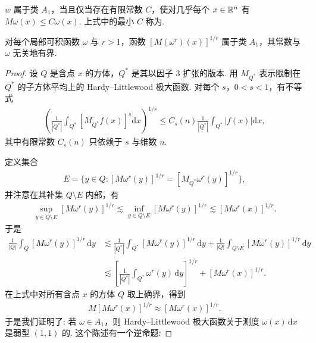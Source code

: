 \begin{definition}\label{def:4.11}
 $w$ 属于类 $A_1$，当且仅当存在有限常数 $C$，使对几乎每个 $x \in \mathbb{R}^n$ 有 $M\omega(x) \leq C\omega(x)$. 上式中的最小 $C$ 称为.
\end{definition}

\begin{proposition}\label{prop:4.12}
对每个局部可积函数 $\omega$ 与 $r > 1$，函数 $[M(\omega^r)(x)]^{1/r}$ 属于类 $A_1$，其常数与 $\omega$ 无关地有界.
\end{proposition}

\begin{proof}
设 $Q$ 是含点 $x$ 的方体，$Q^*$ 是其以因子 $3$ 扩张的版本. 用 $M_{Q^*}$ 表示限制在 $Q^*$ 的子方体平均上的 Hardy--Littlewood 极大函数. 对每个 $s$，$0 < s < 1$，有不等式
\begin{align*}
  \left(\frac{1}{\left|Q^{*}\right|}\int_{Q^{*}}\left[M_{Q^{*}}f(x)\right]^{s}\mathrm{d}x\right)^{1/s}
  \leq C_{s}(n)\frac{1}{\left|Q^{*}\right|}\int_{Q^{*}}\left|f(x)\right|\mathrm{d}x,
\end{align*}
其中有限常数 $C_{s}(n)$ 只依赖于 $s$ 与维数 $n$.

定义集合
\begin{align*}
  E=\big\{y\in Q:[M\omega^{r}(y)]^{1/r}=[M_{Q^{*}}\omega^{r}(y)]^{1/r}\big\},
\end{align*}
并注意在其补集 $Q \setminus E$ 内部，有
\begin{align*}
  \sup_{y\in Q\setminus E}[M\omega^{r}(y)]^{1/r}\lesssim\inf_{y\in Q\setminus E}[M\omega^{r}(y)]^{1/r}
  \lesssim[M\omega^{r}(x)]^{1/r}.
\end{align*}
于是
\begin{align*}
  \frac{1}{|Q|}\int_{Q}[M\omega^{r}(y)]^{1/r}\,\mathrm{d}y
  &\lesssim\frac{1}{|Q^{*}|}\int_{Q^{*}}[M\omega^{r}(y)]^{1/r}\,\mathrm{d}y
   +\frac{1}{|Q|}\int_{Q\setminus E}[M\omega^{r}(y)]^{1/r}\,\mathrm{d}y\\
  &\lesssim\left[\frac{1}{|Q^{*}|}\int_{Q^{*}}\omega^{r}(y)\,\mathrm{d}y\right]^{1/r}
   +[M\omega^{r}(x)]^{1/r}.
\end{align*}
在上式中对所有含点 $x$ 的方体 $Q$ 取上确界，得到
\begin{align*}
  M[M\omega^{r}(x)]^{1/r}\approx[M\omega^{r}(x)]^{1/r}.
\end{align*}
于是我们证明了: 若 $\omega \in A_1$，则 Hardy--Littlewood 极大函数关于测度 $\omega(x)\,\mathrm{d}x$ 是弱型 $(1, 1)$ 的. 这个陈述有一个逆命题:
\end{proof}

